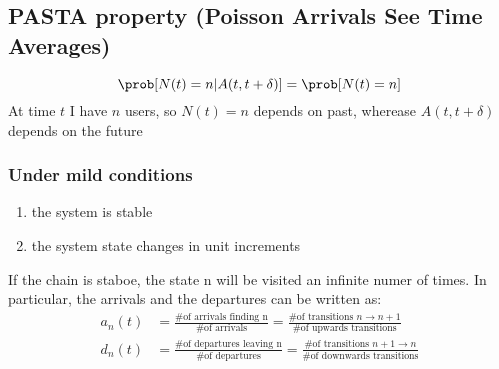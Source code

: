 \subsection{PASTA property (Poisson Arrivals See Time Averages)}
\begin{equation}
  \prob[N(t)=n|A(t,t+\delta)] = \prob[N(t)=n]
\end{equation}
At time $t$ I have $n$ users, so $N(t)=n$ depends on past, wherease $A(t,t+\delta)$ depends on the future

\subsubsection{Under mild conditions}
\begin{enumerate}
  \item the system is stable
  \item the system state changes in unit increments
\end{enumerate}
If the chain is staboe, the state n will be visited an infinite numer of times. In particular, the arrivals and the departures can be written as:
\begin{equation}\begin{split}
a_n(t)&= \frac{\text{\# of arrivals finding n}}{\text{\# of arrivals}} = \frac{\text{\# of transitions } n \to n+1}{\text{\# of upwards transitions}}\\
d_n(t)&= \frac{\text{\# of departures leaving n}}{\text{\# of departures}} = \frac{\text{\# of transitions } n+1 \to n}{\text{\# of downwards transitions}}
\end{split}\end{equation}
